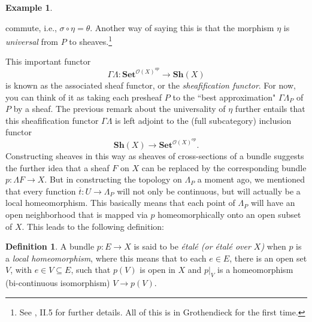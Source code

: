 \documentclass[a4paper]{book}
\theoremstyle{definition}
\newtheorem{example}{Example}[section]
\theoremstyle{definition}
\newtheorem{definition}{Definition}[section]
\theoremstyle{definition}
\theoremstyle{theorem}
\theoremstyle{definition}
\begin{document}
\begin{example}
\begin{center}
\end{center} 
commute, i.e., $\sigma \circ \eta = \theta$. Another way of saying this is that the morphism $\eta$ is \textit{universal} from $P$ to sheaves.\footnote{See \cite{maclane_sheaves_1994}, II.5 for further details. All of this is in Grothendieck for the first time.} \par 
This important functor 
	\begin{equation}
	\Gamma \Lambda: \textbf{Set}^{\mathscr{O}(X)^{op}} \rightarrow \textbf{Sh}(X)
	\end{equation} 
	is known as the associated sheaf functor, or the \textit{sheafification functor}. For now, you can think of it as taking each presheaf $P$ to the ``best approximation" $\Gamma \Lambda_P$ of $P$ by a sheaf. The previous remark about the universality of $\eta$ further entails that this sheafification functor $\Gamma \Lambda$ is left adjoint to the (full subcategory) inclusion functor 
	\begin{equation*}
	\textbf{Sh}(X) \rightarrow \textbf{Set}^{\mathscr{O}(X)^{op}}. 
	\end{equation*}
	Constructing sheaves in this way as sheaves of cross-sections of a bundle suggests the further idea that a sheaf $F$ on $X$ can be replaced by the corresponding bundle $p: \Lambda F \rightarrow X$. But in constructing the topology on $\Lambda_P$ a moment ago, we mentioned that every function $\overline{t}: U \rightarrow \Lambda_P$ will not only be continuous, but will actually be a local homeomorphism. This basically means that each point of $\Lambda_P$ will have an open neighborhood that is mapped via $p$ homeomorphically onto an open subset of $X$. This leads to the following definition: 
	\begin{definition}
		A bundle $p: E \rightarrow X$ is said to be \textit{\'etal\'e (or \'etal\'e over $X$)} when $p$ is a \textit{local homeomorphism}, where this means that to each $e \in E$, there is an open set $V$, with $e \in V \subseteq E$, such that $p(V)$ is open in $X$ and $p|_V$ is a homeomorphism (bi-continuous isomorphism) $V \rightarrow p(V)$.
	\end{definition} \noindent 

\end{example}
\end{document}
